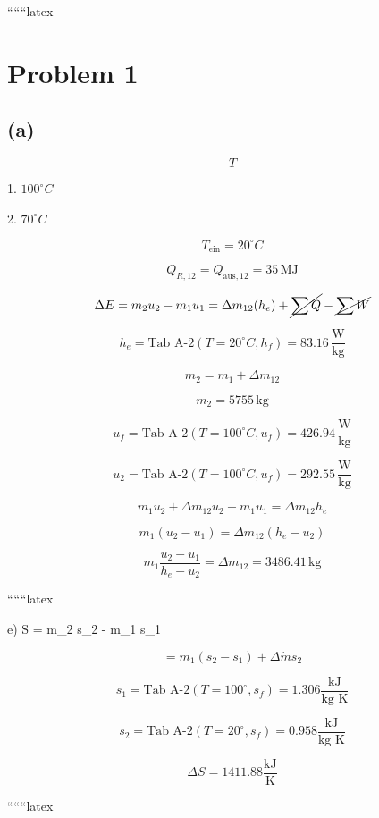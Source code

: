 ``````latex


\section*{Problem 1}

\subsection*{(a)}

\[
T
\]

1. \(100^\circ C\)

2. \(70^\circ C\)

\[
T_{\text{ein}} = 20^\circ C
\]

\[
Q_{R,12} = Q_{\text{aus},12} = 35 \, \text{MJ}
\]


\[
\Delta E = m_2 u_2 - m_1 u_1 = \Delta m_{12} (h_e) + \cancel{\sum Q} - \cancel{\sum W}
\]

\[
h_e = \text{Tab A-2} \left( T = 20^\circ C, h_f \right) = 83.16 \, \frac{\text{W}}{\text{kg}}
\]

\[
m_2 = m_1 + \Delta m_{12}
\]

\[
m_2 = 5755 \, \text{kg}
\]

\[
u_f = \text{Tab A-2} \left( T = 100^\circ C, u_f \right) = 426.94 \, \frac{\text{W}}{\text{kg}}
\]

\[
u_2 = \text{Tab A-2} \left( T = 100^\circ C, u_f \right) = 292.55 \, \frac{\text{W}}{\text{kg}}
\]

\[
m_1 u_2 + \Delta m_{12} u_2 - m_1 u_1 = \Delta m_{12} h_e
\]

\[
m_1 (u_2 - u_1) = \Delta m_{12} (h_e - u_2)
\]

\[
m_1 \frac{u_2 - u_1}{h_e - u_2} = \Delta m_{12} = 3486.41 \, \text{kg}
\]

``````latex

e) \quad \Delta S = m_2 s_2 - m_1 s_1

\[
= m_1 (s_2 - s_1) + \Delta \dot{m} s_2
\]

\[
s_1 = \text{Tab A-2} \left( T = 100^\circ, s_f \right) = 1.306 \frac{\text{kJ}}{\text{kg K}}
\]

\[
s_2 = \text{Tab A-2} \left( T = 20^\circ, s_f \right) = 0.958 \frac{\text{kJ}}{\text{kg K}}
\]

\[
\Delta S = 1411.88 \frac{\text{kJ}}{\text{K}}
\]

``````latex


